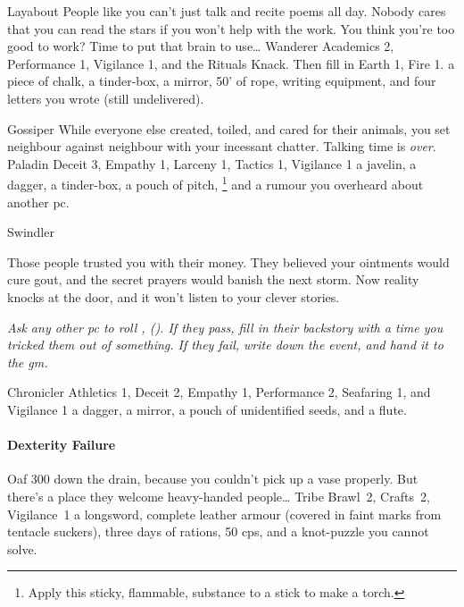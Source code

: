 \begin{multicols}{2}
\begin{itemize}
    {Layabout}%
    {
      People like you can't just talk and recite poems all day.
      Nobody cares that you can read the stars if you won't help with the work.
      You think you're too good to work?
      Time to put that brain to use\ldots
    }%
    {Wanderer}%
    {%
      Academics 2, Performance 1, Vigilance 1, and the Rituals Knack.
    Then fill in Earth 1, Fire 1.
    }%
    {
      a piece of chalk, a tinder-box, a mirror, 50' of rope, writing equipment, and four letters you wrote (still undelivered).
    }%

    {Gossiper}%
    {
      While everyone else created, toiled, and cared for their animals, you set neighbour against neighbour with your incessant chatter.
      Talking time is \emph{over}.
    }%
    {Paladin}%
    {Deceit 3, Empathy 1, Larceny 1, Tactics 1, Vigilance 1}%
    {
      a javelin, a dagger, a tinder-box, a pouch of pitch,%
      \footnote{Apply this sticky, flammable, substance to a stick to make a torch.}
      and a rumour you overheard about another \gls{pc}.
    }%

    {Swindler}%
    {
      Those people trusted you with their money.
      They believed your ointments would cure gout, and the secret prayers would banish the next storm.
      Now reality knocks at the door, and it won't listen to your clever stories.

      \textit{Ask any other \gls{pc} to roll , (\tn[8]).
      If they pass, fill in their backstory with a time you tricked them out of something.
      If they fail, write down the event, and hand it to the \gls{gm}.}
    }%
    {Chronicler}%
    {Athletics 1, Deceit 2, Empathy 1, Performance 2, Seafaring 1, and Vigilance 1}%
    {
      a dagger, a mirror, a pouch of unidentified seeds, and a flute.
    }%

\end{itemize}

\paragraph{Dexterity Failure}

\begin{itemize}

    {Oaf}%
    {
      300  down the drain, because you couldn't pick up a vase properly.
      But there's a place they welcome heavy-handed people\ldots
    }%
    {Tribe}%
    {
      Brawl~2, Crafts~2, Vigilance~1
    }%
    {
      a longsword, complete leather armour (covered in faint marks from tentacle suckers), three days of rations, 50 \glspl{cp}, and a knot-puzzle you cannot solve.
    }%


\end{itemize}
\end{multicols}
